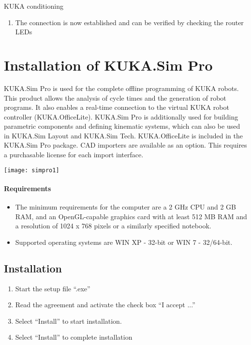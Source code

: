 \documentclass{book}
\begin{document}
\begin{chapter}{KUKA conditioning}
\begin{enumerate}
				\item The connection is now established and can be verified by checking the router LEDs
			\end{enumerate}
		
	\newpage
	\section{Installation of KUKA.Sim Pro}
	KUKA.Sim Pro is used for the complete offline programming of KUKA robots. This product allows the analysis of cycle times and the generation of robot programs. It also enables a real-time connection to the virtual KUKA robot controller (KUKA.OfficeLite). KUKA.Sim Pro is additionally used for building parametric components and defining kinematic systems, which can also be used in KUKA.Sim Layout and KUKA.Sim Tech. KUKA.OfficeLite is included in the KUKA.Sim Pro package. CAD importers are available as an option. This requires a purchasable license for each import interface. 
	


	\begin{center}
	\texttt{[image: simpro1]}
	\end{center}
	 
	 \paragraph{Requirements}
	 	\begin{itemize}
	 	\item The minimum requirements for the computer are a 2 GHz CPU and 2 GB RAM, and an OpenGL-capable graphics card with at least 512 MB RAM and a resolution of 1024 x 768 pixels or a similarly specified notebook.
	 	\item Supported operating systems are WIN XP - 32-bit or WIN 7 - 32/64-bit.
	 \end{itemize}
 
 	\subsection{Installation}
 		\begin{enumerate}
 			\item Start the setup file “.exe”
 			\item Read the agreement and activate the check box “I accept ...”
 			\item Select “Install” to start installation.
 			\item Select “Install” to complete installation
 		\end{enumerate}
 	

\end{chapter}
\end{document}
